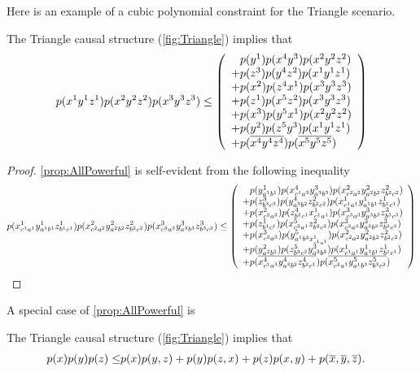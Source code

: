 Here is an example of a cubic polynomial constraint for the Triangle scenario. 
\begin{prop} \label{prop:AllPowerful}
The Triangle causal structure (\cref{fig:Triangle}) implies that
\begin{align*}\begin{split}
p\lparen x^1 y^1 z^1\rparen p\lparen x^2 y^2 z^2\rparen p\lparen x^3 y^3 z^3\rparen
\leq
\left\lparen\begin{array}{l}
   \hphantom{+}p\lparen y^1\rparen p\lparen x^4 y^3\rparen p\lparen x^2 y^2 z^2\rparen
\\+p\lparen z^3\rparen p\lparen y^4 z^2\rparen p\lparen x^1 y^1 z^1\rparen
\\+p\lparen x^2\rparen p\lparen z^4 x^1\rparen p\lparen x^3 y^3 z^3\rparen
\\+p\lparen z^1\rparen p\lparen x^5 z^2\rparen p\lparen x^3 y^3 z^3\rparen
\\+p\lparen x^3\rparen p\lparen y^5 x^1\rparen p\lparen x^2 y^2 z^2\rparen
\\+p\lparen y^2\rparen p\lparen z^5 y^3\rparen p\lparen x^1 y^1 z^1\rparen
\\+p\lparen\overline{x^4} \overline{y^4} \overline{z^4}\rparen p\lparen\overline{x^5} \overline{y^5} \overline{z^5}\rparen\end{array}\right\rparen
\end{split}\end{align*}
\end{prop}
\begin{proof}\cref{prop:AllPowerful} is self-evident from the following inequality
\begin{align}\label{eq:tri3structineq}
\p{x^1_{c^1 a^1} y^1_{a^1 b^1} z^1_{b^1 c^1}} \p{x^2_{c^2 a^2} y^2_{a^2 b^2} z^2_{b^2 c^2}} \p{x^3_{c^3 a^3} y^3_{a^3 b^3} z^3_{b^3 c^3}}
\leq
\lparens{
   \hphantom{+}\p{y^1_{a^1 b^1}} \p{x^4_{c^1 a^3} y^3_{a^3 b^3}} \p{x^2_{c^2 a^2} y^2_{a^2 b^2} z^2_{b^2 c^2}}
\\+\p{z^3_{b^3 c^3}} \p{y^4_{a^3 b^2} z^2_{b^2 c^2}} \p{x^1_{c^1 a^1} y^1_{a^1 b^1} z^1_{b^1 c^1}}
\\+\p{x^2_{c^2 a^2}} \p{z^4_{b^2 c^1} x^1_{c^1 a^1}} \p{x^3_{c^3 a^3} y^3_{a^3 b^3} z^3_{b^3 c^3}}
\\+\p{z^1_{b^1 c^1}} \p{x^5_{c^2 a^1} z^2_{b^2 c^2}} \p{x^3_{c^3 a^3} y^3_{a^3 b^3} z^3_{b^3 c^3}}
\\+\p{x^3_{c^3 a^3}} \p{y^5_{a^1 b^3 x^1_{c^1 a^1}}} \p{x^2_{c^2 a^2} y^2_{a^2 b^2} z^2_{b^2 c^2}}
\\+\p{y^2_{a^2 b^2}} \p{z^5_{b^3 c^2} y^3_{a^3 b^3}} \p{x^1_{c^1 a^1} y^1_{a^1 b^1} z^1_{b^1 c^1}}
\\+\p{\n{x^4_{c^1 a^3}} \n{y^4_{a^3 b^2}} \n{z^4_{b^2 c^1}}} \p{\n{x^5_{c^2 a^1}} \n{y^5_{a^1 b^3}} \n{z^5_{b^3 c^2}}}
}
\qedhere\end{align}
\end{proof}
A special case of \cref{prop:AllPowerful} is
\begin{prop} \label{prop:FritzF2}
The Triangle causal structure (\cref{fig:Triangle}) implies that
\begin{align*}\begin{split}
p\lparen x\rparen p\lparen y\rparen p\lparen z\rparen\leq&   p\lparen x\rparen p\lparen y,z\rparen + p\lparen y\rparen p\lparen z,x\rparen+ p\lparen z\rparen p\lparen x,y\rparen+p\lparen\overline{x},\overline{y},\overline{z}\rparen.
\end{split}\end{align*}
\end{prop}
